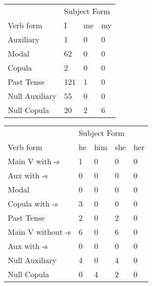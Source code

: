 \begin{table}[]
\begin{minipage}{0.5\textwidth}
    \centering
    \begin{tabular}{@{}llll@{}}
        \toprule
            &\multicolumn{3}{l}{Subject Form}\\
            \cline{2-4}
        Verb form & I & me & my \\
        \midrule
        Auxiliary & 1 & 0 & 0 \\
        Modal & 62 & 0 & 0 \\
        Copula & 2 & 0 & 0 \\
        Past Tense & 121 & 1 & 0 \\
        \hline
        Null Auxiliary & 55 & 0 & 0 \\
        Null Copula & 20 & 2 & 6 \\
        \bottomrule
    \end{tabular}
\end{minipage}
\begin{minipage}{0.5\textwidth}
    \centering
    \begin{tabular}{@{}lllll@{}}
        \toprule
            &\multicolumn{4}{l}{Subject Form}\\
            \cline{2-5}
        Verb form & he & him & she & her \\
        \midrule
        Main V with -s & 1 & 0 & 0 & 0 \\
        Aux with -s & 0 & 0 & 0 & 0 \\
        Modal & 0 & 0 & 0 & 0 \\
        Copula with -s & 3 & 0 & 0 & 0 \\
        Past Tense & 2 & 0 & 2 & 0 \\
        \hline
        Main V without -s & 6 & 0 & 6 & 0 \\
        Aux with -s & 0 & 0 & 0 & 0 \\
        Null Auxiliary & 4 & 0 & 4 & 0 \\
        Null Copula & 0 & 4 & 2 & 0 \\
        \bottomrule
    \end{tabular}
    \end{minipage}
\end{table}
